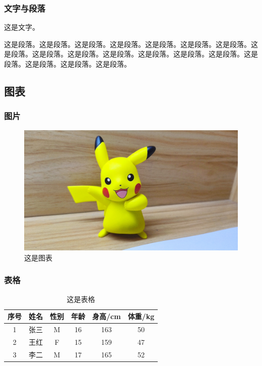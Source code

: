 \begin{ujnbody}
    \subsubsection{文字与段落}
    这是文字。

    这是段落。这是段落。这是段落。这是段落。这是段落。这是段落。这是段落。这是段落。这是段落。这是段落。这是段落。这是段落。这是段落。这是段落。这是段落。这是段落。这是段落。这是段落。
    \subsection{图表}

    \subsubsection{图片}

    \begin{figure}[htbp]
        \centering
        \includegraphics[scale=0.1, ]{figures/pikachu.jpg}
        \caption{这是图表}
    \end{figure}

    \subsubsection{表格}

    \begin{table}[!htbp]
        \centering
        \begin{tabular}{cccccc}
            \toprule
            序号 & 姓名 & 性别 & 年龄 & 身高/cm & 体重/kg \\
            \midrule
            1 & 张三 & M & 16 & 163 & 50 \\
            2 & 王红 & F & 15 & 159 & 47 \\
            3 & 李二 & M & 17 & 165 & 52 \\
            \bottomrule
        \end{tabular}
        \caption{这是表格}
    \end{table}


\end{ujnbody}
